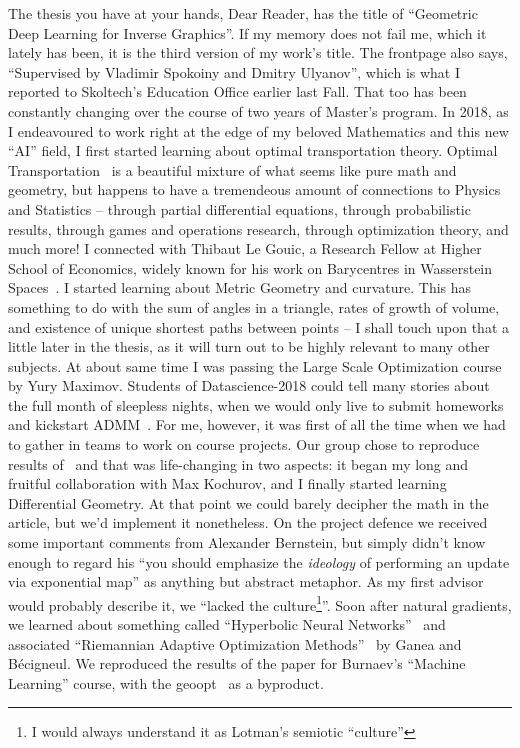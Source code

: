 The thesis you have at your hands, Dear Reader, has the title of ``Geometric
Deep Learning for Inverse Graphics''. If my memory does not fail me, which it
lately has been, it is the third version of my work's title. The frontpage also
says, ``Supervised by Vladimir Spokoiny and Dmitry Ulyanov'', which is what I
reported to Skoltech's Education Office earlier last Fall. That too has been
constantly changing over the course of two years of Master's program.  In 2018,
as I endeavoured to work right at the edge of my beloved Mathematics and this
new ``AI'' field, I first started learning about optimal transportation theory.
Optimal Transportation~\citep{villaniOldNew,ambrosioOTSummerSchool} is a
beautiful mixture of what seems like pure math and geometry, but happens to
have a tremendeous amount of connections to Physics and Statistics -- through
partial differential equations, through probabilistic results, through games
and operations research, through optimization theory, and much more! I
connected with Thibaut Le Gouic, a Research Fellow at Higher School of
Economics, widely known for his work on Barycentres in Wasserstein
Spaces~\citep{le2017existence}. I started learning about Metric Geometry and
curvature. This has something to do with the sum of angles in a triangle, rates
of growth of volume, and existence of unique shortest paths between points -- I
shall touch upon that a little later in the thesis, as it will turn out to be
highly relevant to many other subjects. At about same time I was passing the
Large Scale Optimization course by Yury Maximov. Students of Datascience-2018
could tell many stories about the full month of sleepless nights, when we would
only live to submit homeworks and kickstart ADMM~\citep{admmTweet,admmBoyd}.
For me, however, it was first of all the time when we had to gather in teams to work
on course projects. Our group chose to reproduce results
of~\citet{acceleratingNatgrad} and that was life-changing in two aspects: it
began my long and fruitful collaboration with Max Kochurov, and I
finally started learning Differential Geometry. At that point we could barely
decipher the math in the article, but we'd implement it nonetheless. On the project
defence we received some important comments from Alexander Bernstein, but simply
didn't know enough to regard his ``you should emphasize the \emph{ideology}
of performing an update via exponential map'' as anything but abstract
metaphor.  As my first advisor would probably describe it, we ``lacked the
culture\footnote{I would always understand it as Lotman's semiotic
``culture''}''.  Soon after natural gradients, we learned about something called
``Hyperbolic Neural Networks''~\citep{ganeaHNNs} and associated ``Riemannian
Adaptive Optimization Methods''~\citep{riemAdaptive} by Ganea and B\'ecigneul.
We reproduced the results of the paper for Burnaev's ``Machine Learning'' course,
with the geoopt~\cite{geoopt} as a byproduct.


